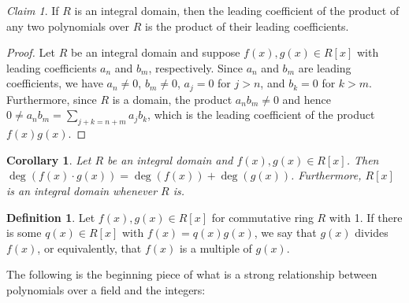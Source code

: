 \documentclass[12pt,letterpaper,DIV=11,final]{scrartcl}
\theoremstyle{plain}
\newtheorem{corollary}{Corollary}
\theoremstyle{definition}
\newtheorem{definition}{Definition}[section]
\theoremstyle{remark}
\newtheorem{claim}{Claim}
\begin{document}
\begin{claim}
  If $R$ is an integral domain, then the leading coefficient of the product of any two polynomials over $R$ is the product of their leading coefficients.

  \begin{proof}
    Let $R$ be an integral domain and suppose $f(x), g(x) \in R[x]$ with leading coefficients $a_n$ and $b_m$, respectively.
    Since $a_n$ and $b_m$ are leading coefficients, we have $a_n \neq 0$, $b_m \neq 0$, $a_j = 0$ for $j > n$, and $b_k = 0$ for $k > m$.
    Furthermore, since $R$ is a domain, the product $a_n b_m \neq 0$ and hence $0 \neq a_n b_m = \sum_{j + k = n + m} a_j b_k$, which is the leading coefficient of the product $f(x) g(x)$.
  \end{proof}
\end{claim}

\begin{corollary}
  Let $R$ be an integral domain and $f(x), g(x) \in R[x]$.
  Then $\deg(f(x) \cdot g(x)) = \deg(f(x)) + \deg(g(x))$.
  Furthermore, $R[x]$ is an integral domain whenever $R$ is.
\end{corollary}

\begin{definition}
  Let $f(x), g(x) \in R[x]$ for commutative ring $R$ with 1.
  If there is some $q(x) \in R[x]$ with $f(x) = q(x) g(x)$, we say that $g(x)$ divides $f(x)$, or equivalently, that $f(x)$ is a multiple of $g(x)$.
\end{definition}

The following is the beginning piece of what is a strong relationship between polynomials over a field and the integers:
\end{document}
